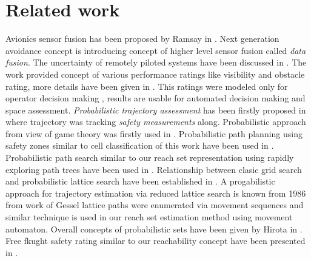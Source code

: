 \section{Related work}
\noindent Avionics sensor fusion has been proposed by Ramsay in \cite{ramasamy2014avionics}. Next generation avoidance concept \cite{ramasamy2014next} is introducing concept of higher level sensor fusion called \emph{data fusion}. The uncertainty of remotely piloted systems have been discussed in \cite{chynchenko2016remotely}. The work provided concept of various performance ratings like visibility and obstacle rating, more details have been given in \cite{shmelova2016modeling}. This ratings were modeled only for operator decision making \cite{kharchenko2017modelling}, results are usable for automated decision making and space assessment. \emph{Probabilistic trajectory assessment} has been firstly proposed in \cite{kim2007uav} where trajectory was tracking \emph{safety measurements} along. Probabilistic approach from view of game theory was firstly used in \cite{vidal2002probabilistic}. Probabilistic path planning using safety zones similar to cell classification of this work have been used in \cite{pfeiffer2005path}. Probabilistic path search similar to our reach set representation using rapidly exploring path trees have been used in \cite{kothari2013probabilistically,blackmore2006probabilistic}. Relationship between clasic grid search and probabilistic lattice search have been established in \cite{lavalle2004relationship}. A progabilistic approach for trajectory estimation via reduced lattice search is known from 1986 from work of Gessel \cite{gessel1986probabilistic} lattice paths were enumerated via movement sequences and similar technique is used in our reach set estimation method using movement automaton. Overall concepts of probabilistic sets have been given by Hirota in \cite{hirota1981concepts}. Free fkught safety rating similar to our reachability concept have been presented in \cite{hoekstra2002designing}.


